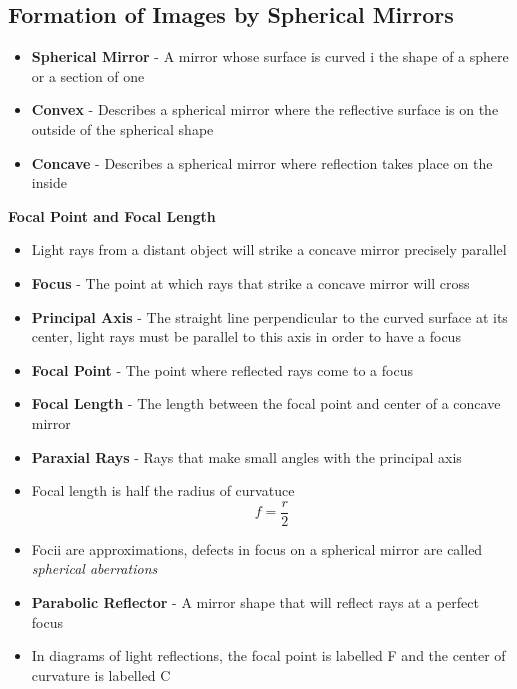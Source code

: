 \subsection{Formation of Images by Spherical Mirrors}
\begin{itemize}
    \item \textbf{Spherical Mirror} - A mirror whose surface is curved i the shape of a sphere or a section of one
    \item \textbf{Convex} - Describes a spherical mirror where the reflective surface is on the outside of the spherical shape
    \item \textbf{Concave} - Describes a spherical mirror where reflection takes place on the inside
\end{itemize}

\textbf{Focal Point and Focal Length}
\begin{itemize}
    \item Light rays from a distant object will strike a concave mirror precisely parallel
    \item \textbf{Focus} - The point at which rays that strike a concave mirror will cross
    \item \textbf{Principal Axis} - The straight line perpendicular to the curved surface at its center, light rays must be parallel to this axis in order to have a focus
    \item \textbf{Focal Point} - The point where reflected rays come to a focus
    \item \textbf{Focal Length} - The length between the focal point and center of a concave mirror
    \item \textbf{Paraxial Rays} - Rays that make small angles with the principal axis
    \item Focal length is half the radius of curvatuce \[f=\frac{r}{2}\]
    \item Focii are approximations, defects in focus on a spherical mirror are called \emph{spherical aberrations}
    \item \textbf{Parabolic Reflector} - A mirror shape that will reflect rays at a perfect focus
    \item In diagrams of light reflections, the focal point is labelled F and the center of curvature is labelled C
\end{itemize}

